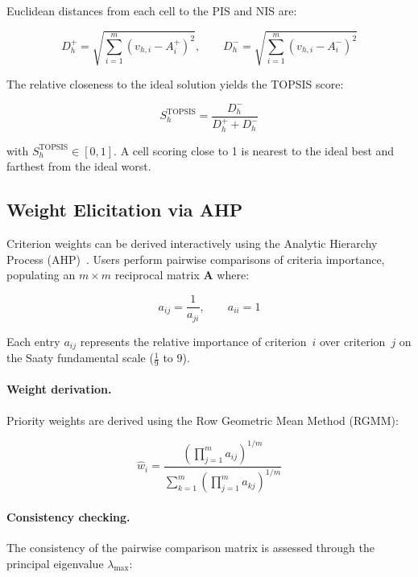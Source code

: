 \noindent Euclidean distances from each cell to the PIS and NIS are:

\begin{equation}
D_h^{+} = \sqrt{\sum_{i=1}^{m} (v_{h,i} - A^{+}_i)^2}, \qquad
D_h^{-} = \sqrt{\sum_{i=1}^{m} (v_{h,i} - A^{-}_i)^2}
\end{equation}

\noindent The relative closeness to the ideal solution yields the TOPSIS score:

\begin{equation}
\label{eq:topsis}
S_h^{\text{TOPSIS}} = \frac{D_h^{-}}{D_h^{+} + D_h^{-}}
\end{equation}

\noindent with $S_h^{\text{TOPSIS}} \in [0,1]$. A cell scoring close to 1 is nearest to the ideal best and farthest from the ideal worst.

\subsection{Weight Elicitation via AHP}
\label{sec:ahp}

Criterion weights can be derived interactively using the Analytic Hierarchy Process (AHP)~\cite{saaty1980ahp}. Users perform pairwise comparisons of criteria importance, populating an $m \times m$ reciprocal matrix $\mathbf{A}$ where:

\begin{equation}
a_{ij} = \frac{1}{a_{ji}}, \qquad a_{ii} = 1
\end{equation}

\noindent Each entry $a_{ij}$ represents the relative importance of criterion~$i$ over criterion~$j$ on the Saaty fundamental scale ($\tfrac{1}{9}$ to $9$).

\paragraph{Weight derivation.}
Priority weights are derived using the Row Geometric Mean Method (RGMM):

\begin{equation}
\label{eq:ahp-weights}
\hat{w}_i = \frac{\left(\prod_{j=1}^{m} a_{ij}\right)^{1/m}}{\sum_{k=1}^{m} \left(\prod_{j=1}^{m} a_{kj}\right)^{1/m}}
\end{equation}

\paragraph{Consistency checking.}
The consistency of the pairwise comparison matrix is assessed through the principal eigenvalue $\lambda_{\max}$:

